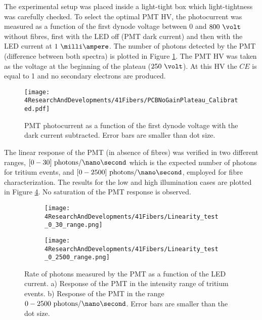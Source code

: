 The experimental setup was placed inside a light-tight box which light-tightness was carefully checked. To select the optimal PMT HV, the photocurrent was measured as a function of the first dynode voltage between $0$ and $800~\volt$ without fibres, first with the LED off (PMT dark current) and then with the LED current at $1~\milli\ampere$. The number of photons detected by the PMT (difference between both spectra) is plotted in Figure \ref{fig:PlateauNoGainPMT}. The PMT HV was taken as the voltage at the beginning of the plateau ($250~\volt$). At this HV the $CE$ is equal to 1 and no secondary electrons are produced. 
\begin{figure}[h]
\centering
\texttt{[image: 4ResearchAndDevelopments/41Fibers/PCBNoGainPlateau\_Calibrated.pdf]}
\caption{PMT photocurrent as a function of the first dynode voltage with the dark current subtracted. Error bars are smaller than dot size.\label{fig:PlateauNoGainPMT}}
\end{figure}

The linear response of the PMT (in absence of fibres) was verified in two different ranges, $[0-30]~\text{photons}/\nano\second$ which is the expected number of photons for tritium events, and $[0-2500]~\text{photons}/\nano\second$, employed for fibre characterization. The results for the low and high illumination cases are plotted in Figure \ref{fig:LinearityRangesOfPMT}. No saturation of the PMT response is observed.

\begin{figure}
\centering
    \begin{subfigure}[b]{1\textwidth}
    \centering
    \texttt{[image: 4ResearchAndDevelopments/41Fibers/Linearity\_test\_0\_30\_range.png]}  
    \caption{\label{subfig:LinearityTritiumRange}}
    \end{subfigure}
    \hfill
    \begin{subfigure}[b]{1\textwidth}
    \centering
    \texttt{[image: 4ResearchAndDevelopments/41Fibers/Linearity\_test\_0\_2500\_range.png]}  
    \caption{\label{subfig:LinearityStudyRange}}
    \end{subfigure}
 \caption{Rate of photons measured by the PMT as a function of the LED current. a) Response of the PMT in the intensity range of tritium events. b) Response of the PMT in the range $0-2500~\text{photons}/\nano\second$. Error bars are smaller than the dot size.}
 \label{fig:LinearityRangesOfPMT}
\end{figure}